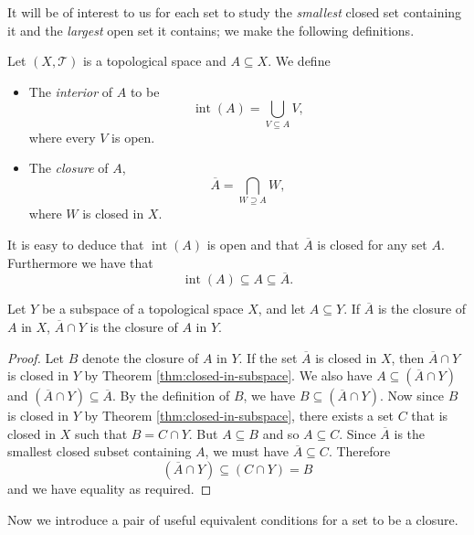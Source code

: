 It will be of interest to us for each set to study the \emph{smallest}
closed set containing it and the \emph{largest} open set it contains;
we make the following definitions.

\begin{defn}
  Let $(X, \mathscr{T})$ is a topological space and $A \subseteq
  X$. We define
  \begin{itemize}
  \item The \emph{interior} of $A$ to be
    \[
      \operatorname{int}(A) = \bigcup_{V \subseteq A} V,
    \]
    where every $V$ is open.
  \item The \emph{closure} of $A$,
    \[
      \overline{A} = \bigcap_{W \supseteq A} W,
    \]
    where $W$ is closed in $X$.
  \end{itemize}
\end{defn}

It is easy to deduce that $\operatorname{int}(A)$ is open and that
$\overline{A}$ is closed for any set $A$. Furthermore we have that
\[
  \operatorname{int}(A) \subseteq A \subseteq \overline{A}.
\]


\begin{thm}
  Let $Y$ be a subspace of a topological space $X$, and let $A
  \subseteq Y$. If $\overline{A}$ is the closure of $A$ in $X$,
  $\overline{A} \cap Y$ is the closure of $A$ in $Y$.
\end{thm}

\begin{proof}
  Let $B$ denote the closure of $A$ in $Y$. If the set $\overline{A}$
  is closed in $X$, then $\overline{A} \cap Y$ is closed in $Y$ by
  Theorem \ref{thm:closed-in-subspace}. We also have $A \subseteq
  (\overline{A} \cap Y)$ and $(\overline{A} \cap Y) \subseteq
  \overline{A}$. By the definition of $B$, we have $B \subseteq
  (\overline{A} \cap Y)$. Now since $B$ is closed in $Y$ by Theorem
  \ref{thm:closed-in-subspace}, there exists a set $C$ that is closed
  in $X$ such that $B = C \cap Y$. But $A \subseteq B$ and so $A
  \subseteq C$. Since $\overline{A}$ is the smallest closed subset
  containing $A$, we must have $\overline{A} \subseteq C$. Therefore
  \[
    (\overline{A} \cap Y) \subseteq (C \cap Y) = B
  \]
  and we have equality as required.
\end{proof}

Now we introduce a pair of useful equivalent conditions for a set to
be a closure.

